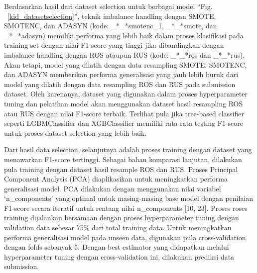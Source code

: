 \documentclass[conference]{IEEEtran}
\begin{document}
Berdasarkan hasil dari dataset selection untuk berbagai model ``Fig. ~\ref{kid_datasetselection}'', teknik imbalance handling dengan SMOTE, SMOTENC, dan ADASYN (kode: \_*\_*smotenc\_1, \_*\_*smote, dan \_*\_*adasyn) 
memiliki performa yang lebih baik dalam proses klasifikasi pada training set dengan nilai F1-score yang tinggi jika dibandingkan dengan imbalance handling dengan ROS ataupun RUS 
(kode: \_*\_*ros dan \_*\_*rus). Akan tetapi, model yang dilatih dengan data resampling SMOTE, SMOTENC, dan ADASYN memberikan performa generalisasi yang jauh lebih buruk dari model yang dilatih dengan data 
resampling ROS dan RUS pada submission dataset. Oleh karenanya, dataset yang digunakan dalam proses hyperparameter tuning dan pelatihan model akan menggunakan dataset hasil resampling ROS atau RUS dengan nilai 
F1-score terbaik. Terlihat pula jika tree-based classifier seperti LGBMClassifier dan XGBClassifier memiliki rata-rata testing F1-score untuk proses dataset selection yang lebih baik.

Dari hasil data selection, selanjutnya adalah proses training dengan dataset yang menawarkan F1-score tertinggi. Sebagai bahan komparasi lanjutan, dilakukan pula training dengan dataset hasil resample ROS dan RUS. 
Proses Principal Component Analysis (PCA) diaplikasikan untuk meningkatkan performa generalisasi model. PCA dilakukan dengan menggunakan nilai variabel 
‘n\_components’ yang optimal untuk masing-masing base model dengan penilaian F1-score secara iteratif untuk rentang nilai n\_components [10, 23]. Proses roses training dijalankan bersamaan dengan proses 
hyperparameter tuning dengan validation data sebesar 75\% dari total training data. Untuk meningkatkan performa generalisasi model pada unseen data, digunakan pula 
cross-validation dengan folds sebanyak 5. Dengan best estimator yang didapatkan melalui hyperparameter tuning dengan cross-validation ini, dilakukan prediksi data submission.
\end{document}
